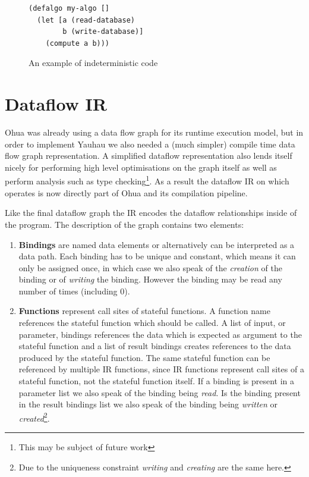 \begin{figure}
\begin{verbatim}
(defalgo my-algo []
  (let [a (read-database)
        b (write-database)]
    (compute a b)))
\end{verbatim}
\caption{An example of indeterministic code}
\label{fig:indeterministic-code}
\end{figure}

\section{Dataflow IR}

Ohua was already using a data flow graph for its runtime execution model, but in order to implement Yauhau we also needed a (much simpler) compile time data flow graph representation.
A simplified dataflow representation also lends itself nicely for performing high level optimisations on the graph itself as well as perform analysis such as type checking\footnote{This may be subject of future work}.
As a result the dataflow IR on which \yauhau{} operates is now directly part of Ohua and its compilation pipeline.

Like the final dataflow graph the IR encodes the dataflow relationships inside of the program.
The description of the graph contains two elements:

\begin{enumerate}
    \item \textbf{Bindings} are named data elements or alternatively can be interpreted as a data path.
    Each binding has to be unique and constant, which means it can only be assigned once, in which case we also speak of the \textit{creation} of the binding or of \textit{writing} the binding.
    However the binding may be read any number of times (including 0).
    \item \textbf{Functions} represent call sites of stateful functions.
    A function name references the stateful function which should be called.
    A list of input, or parameter, bindings references the data which is expected as argument to the stateful function and a list of result bindings creates references to the data produced by the stateful function.
    The same stateful function can be referenced by multiple IR functions, since IR functions represent call sites of a stateful function, not the stateful function itself.
    If a binding is present in a parameter list we also speak of the binding being \textit{read}.
    Is the binding present in the result bindings list we also speak of the binding being \textit{written} or \textit{created}\footnote{Due to the uniqueness constraint \textit{writing} and \textit{creating} are the same here.}.
\end{enumerate}

